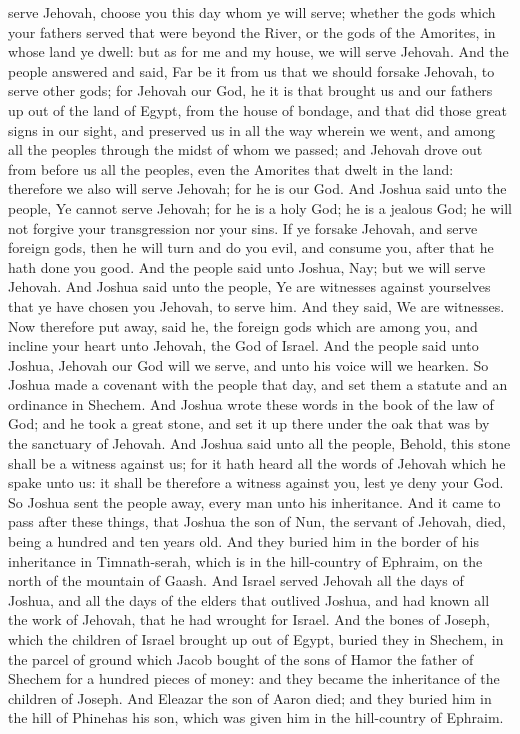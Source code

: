 serve Jehovah, choose you this day whom ye will serve; whether the gods which your fathers served that were beyond the River, or the gods of the Amorites, in whose land ye dwell: but as for me and my house, we will serve Jehovah.  And the people answered and said, Far be it from us that we should forsake Jehovah, to serve other gods; for Jehovah our God, he it is that brought us and our fathers up out of the land of Egypt, from the house of bondage, and that did those great signs in our sight, and preserved us in all the way wherein we went, and among all the peoples through the midst of whom we passed; and Jehovah drove out from before us all the peoples, even the Amorites that dwelt in the land: therefore we also will serve Jehovah; for he is our God.  And Joshua said unto the people, Ye cannot serve Jehovah; for he is a holy God; he is a jealous God; he will not forgive your transgression nor your sins. If ye forsake Jehovah, and serve foreign gods, then he will turn and do you evil, and consume you, after that he hath done you good. And the people said unto Joshua, Nay; but we will serve Jehovah. And Joshua said unto the people, Ye are witnesses against yourselves that ye have chosen you Jehovah, to serve him. And they said, We are witnesses. Now therefore put away, said he, the foreign gods which are among you, and incline your heart unto Jehovah, the God of Israel. And the people said unto Joshua, Jehovah our God will we serve, and unto his voice will we hearken. So Joshua made a covenant with the people that day, and set them a statute and an ordinance in Shechem. And Joshua wrote these words in the book of the law of God; and he took a great stone, and set it up there under the oak that was by the sanctuary of Jehovah. And Joshua said unto all the people, Behold, this stone shall be a witness against us; for it hath heard all the words of Jehovah which he spake unto us: it shall be therefore a witness against you, lest ye deny your God. So Joshua sent the people away, every man unto his inheritance.  And it came to pass after these things, that Joshua the son of Nun, the servant of Jehovah, died, being a hundred and ten years old. And they buried him in the border of his inheritance in Timnath-serah, which is in the hill-country of Ephraim, on the north of the mountain of Gaash. And Israel served Jehovah all the days of Joshua, and all the days of the elders that outlived Joshua, and had known all the work of Jehovah, that he had wrought for Israel.  And the bones of Joseph, which the children of Israel brought up out of Egypt, buried they in Shechem, in the parcel of ground which Jacob bought of the sons of Hamor the father of Shechem for a hundred pieces of money: and they became the inheritance of the children of Joseph. And Eleazar the son of Aaron died; and they buried him in the hill of Phinehas his son, which was given him in the hill-country of Ephraim. 